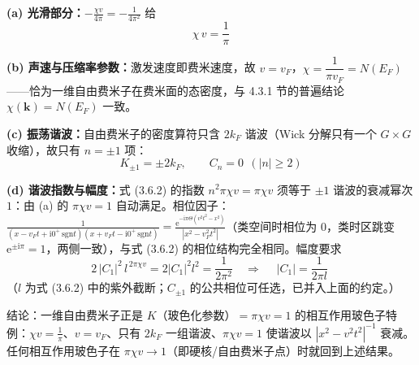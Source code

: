 \textbf{(a) 光滑部分：}$-\frac{\chi v}{4\pi}=-\frac{1}{4\pi^2}$ 给
\begin{equation*}
\boxed{\;\chi\,v=\frac{1}{\pi}\;}
\end{equation*}

\textbf{(b) 声速与压缩率参数：}激发速度即费米速度，故 $v=v_F$，$\chi=\dfrac{1}{\pi v_F}=N(E_F)$——恰为一维自由费米子在费米面的态密度，与 4.3.1 节的普遍结论 $\chi(\pmb{k})=N(E_F)$ 一致。

\textbf{(c) 振荡谐波：}自由费米子的密度算符只含 $2k_F$ 谐波（Wick 分解只有一个 $G\times G$ 收缩），故只有 $n=\pm1$ 项：
\begin{equation*}
\boxed{\;K_{\pm1}=\pm2k_F,\qquad C_n=0\ \ (|n|\ge2)\;}
\end{equation*}

\textbf{(d) 谐波指数与幅度：}式 (3.6.2) 的指数 $n^2\pi\chi v=\pi\chi v$ 须等于 $\pm1$ 谐波的衰减幂次 $1$：由 (a) 的 $\pi\chi v=1$ 自动满足。相位因子：$\frac{1}{(x-v_Ft+\mathrm{i}0^+\,\mathrm{sgn}t)(x+v_Ft-\mathrm{i}0^+\,\mathrm{sgn}t)}=\frac{\mathrm{e}^{-\mathrm{i}\pi\Theta(v^2t^2-x^2)}}{|x^2-v_F^2t^2|}$（类空间时相位为 0，类时区跳变 $\mathrm{e}^{\pm\mathrm{i}\pi}=1$，两侧一致），与式 (3.6.2) 的相位结构完全相同。幅度要求
\begin{equation*}
2\,|C_1|^2\,l^{\,2\pi\chi v}=2|C_1|^2l^2=\frac{1}{2\pi^2}
\quad\Longrightarrow\quad
\boxed{\;|C_1|=\frac{1}{2\pi l}\;}
\end{equation*}
（$l$ 为式 (3.6.2) 中的紫外截断；$C_{\pm1}$ 的公共相位可任选，已并入上面的约定。）

结论：一维自由费米子正是 $K$（玻色化参数）$=\pi\chi v=1$ 的相互作用玻色子特例：$\chi v=\frac{1}{\pi}$、$v=v_F$、只有 $2k_F$ 一组谐波、$\pi\chi v=1$ 使谐波以 $|x^2-v^2t^2|^{-1}$ 衰减。任何相互作用玻色子在 $\pi\chi v\to1$（即硬核/自由费米子点）时就回到上述结果。

